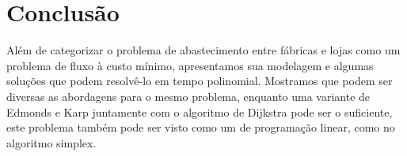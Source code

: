 \documentclass[12pt,a4]{article}
\begin{document}
\section{Conclusão}
\label{sec:conclusion}

Além de categorizar o problema de abastecimento entre fábricas e lojas como um
problema de fluxo à custo mínimo, apresentamos sua modelagem e algumas soluções
que podem resolvê-lo em tempo polinomial. Mostramos que podem ser diversas as
abordagens para o mesmo problema, enquanto uma variante de Edmonds e Karp
juntamente com o algoritmo de Dijkstra pode ser o suficiente, este problema
também pode ser visto como um de programação linear, como no algoritmo simplex.



\end{document}
